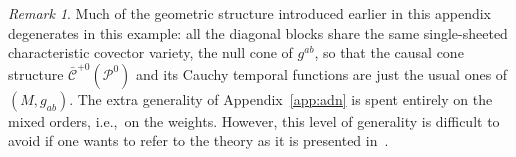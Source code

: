 \documentclass[a4paper]{article}
\theoremstyle{remark}
\newtheorem{rem}{Remark}
\begin{document}
\begin{rem}
Much of the geometric structure introduced earlier in this appendix
degenerates in this example: all the diagonal blocks share the same
single-sheeted characteristic covector variety, the null cone of
$g^{ab}$, so that the causal cone structure
$\bar{\mathcal{C}}^{+0}(\mathcal{P}^0)$ and its Cauchy temporal
functions are just the usual ones of $(M,g_{ab})$. The extra
generality of Appendix~\ref{app:adn} is spent entirely on the mixed
orders, i.e.,\ on the weights. However, this level of generality is
difficult to avoid if one wants to refer to the theory as it is
presented in~\cite{gv-mixed}.
\end{rem}



\end{document}
